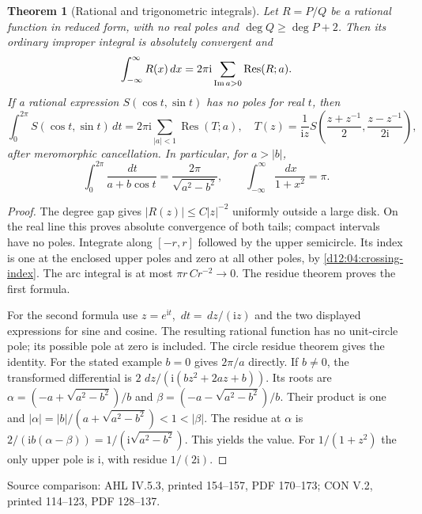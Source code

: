 \documentclass[11pt,a4paper,openany]{book}
\newtheorem{theorem}{Theorem}[chapter]
\theoremstyle{definition}
\theoremstyle{remark}\newtheorem{remark}[theorem]{Remark}
\newcommand{\dd}{\,d}\newcommand{\iu}{\mathrm i}
\DeclareMathOperator{\Res}{Res}\DeclareMathOperator{\ind}{ind}
\newcommand{\family}[1]{}
\newcommand{\source}[1]{\par\begingroup\small\sffamily\color{black!65}Source comparison: #1\par\endgroup}
\begin{document}
\begin{theorem}[Rational and trigonometric integrals]\family{D12.08.04}\label{d12:08-04}
Let \(R=P/Q\) be a rational function in reduced form, with no real
poles and \(\deg Q\ge\deg P+2\). Then its ordinary improper integral
is absolutely convergent and
\[
 \int_{-\infty}^{\infty}R(x)\dd x
    =2\pi\iu\sum_{\Imm a>0}\Res(R;a).
\]
If a rational expression \(S(\cos t,\sin t)\) has no poles for real
\(t\), then
\[
 \int_0^{2\pi}S(\cos t,\sin t)\dd t
 =2\pi\iu\sum_{|a|<1}\Res(T;a),\quad
 T(z)=\frac1{\iu z}
 S\!\left(\frac{z+z^{-1}}2,\frac{z-z^{-1}}{2\iu}\right),
\]
after meromorphic cancellation.
In particular, for \(a>|b|\),
\[
 \int_0^{2\pi}\frac{\dd t}{a+b\cos t}
       =\frac{2\pi}{\sqrt{a^2-b^2}},\qquad
 \int_{-\infty}^{\infty}\frac{\dd x}{1+x^2}=\pi .
\]
\end{theorem}
\begin{proof}
The degree gap gives \(|R(z)|\le C|z|^{-2}\) uniformly outside
a large disk. On the real line this proves absolute convergence of
both tails; compact intervals have no poles.
Integrate along \([-r,r]\) followed by the upper semicircle.
Its index is one at the enclosed upper poles and zero at all other
poles, by \cref{d12:04:crossing-index}.
The arc integral is at most \(\pi r\,Cr^{-2}\to0\).
The residue theorem proves the first formula.

For the second formula use \(z=e^{\iu t}\),
\(\dd t=\dd z/(\iu z)\) and the two displayed expressions for sine
and cosine. The resulting rational function has no unit-circle pole;
its possible pole at zero is included. The circle residue theorem
gives the identity.
For the stated example \(b=0\) gives \(2\pi/a\) directly.
If \(b\ne0\), the transformed differential is
\(2\,\dd z/(\iu(bz^2+2az+b))\).
Its roots are
\(\alpha=(-a+\sqrt{a^2-b^2})/b\) and
\(\beta=(-a-\sqrt{a^2-b^2})/b\).
Their product is one and
\(|\alpha|=|b|/(a+\sqrt{a^2-b^2})<1<|\beta|\).
The residue at \(\alpha\) is
\(2/(\iu b(\alpha-\beta))=1/(\iu\sqrt{a^2-b^2})\).
This yields the value. For \(1/(1+z^2)\) the only upper pole is
\(\iu\), with residue \(1/(2\iu)\).
\end{proof}
\source{AHL IV.5.3, printed 154--157, PDF 170--173; CON V.2, printed 114--123, PDF 128--137.}
\end{document}
